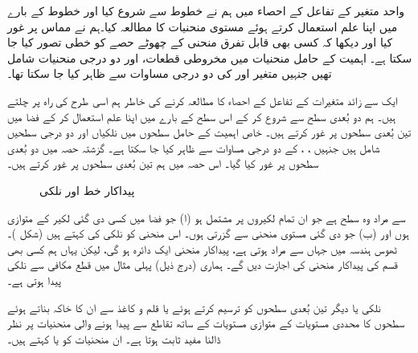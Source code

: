 واحد متغیر کے تفاعل کے احصاء میں  ہم  نے خطوط سے شروع کیا اور خطوط کے بارے میں اپنا علم  استعمال کرتے ہوئے مستوی منحنیات کا مطالعہ کیا۔ہم نے مماس پر غور کیا اور دیکھا کہ  کسی بھی قابل تفرق  منحنی    کے چھوٹے حصے  کو خطی تصور کیا جا سکتا ہے۔ اہمیت کے حامل منحنیات میں مخروطی قطعات، اور دو درجی منحنیات شامل تھیں جنہیں  متغیر  اور  کی دو درجی مساوات سے ظاہر کیا جا سکتا تھا۔

ایک سے زائد متغیرات   کے تفاعل کے احصاء  کا مطالعہ کرنے کی خاطر ہم اسی طرح کی راہ پر چلتے ہیں۔ ہم  دو بُعدی سطح سے شروع کر کے اس سطح کے بارے میں اپنا علم استعمال کر کے فضا میں تین بُعدی سطحوں پر غور کرتے ہیں۔ خاص اہمیت کے حامل سطحوں میں نلکیاں اور دو درجی سطحیں شامل ہیں جنہیں ، ،  کے دو درجی مساوات سے ظاہر کیا جا سکتا ہے۔ گزشتہ حصہ میں  دو بُعدی سطحوں پر غور کیا گیا۔ اس حصہ میں ہم تین بُعدی سطحوں پر غور کرتے ہیں۔
\begin{figure}
\centering
{}
\caption{پیداکار خط اور نلکی}
\label{شکل_سمتیہ_پیداکار_خط_اور_نلکی}
\end{figure}


 سے مراد وہ سطح ہے   جو  ان تمام لکیروں پر مشتمل ہو  (ا)  جو فضا میں کسی دی گئی  لکیر کے متوازی ہوں اور (ب)  جو دی گئی    مستوی منحنی سے گزرتی  ہوں۔  اس منحنی کو نلکی کی   کہتے ہیں (شکل )۔ ٹھوس ہندسہ میں   جہاں  سے مراد  ہوتی ہے، پیداکار منحنی ایک دائرہ ہو گی، لیکن یہاں ہم کسی بھی قسم کی پیداکار منحنی کی اجازت دیں گے۔ ہماری (درج ذیل) پہلی مثال میں  قطع مکافی  سے نلکی پیدا ہوتی ہے۔ 
 
نلکی یا دیگر تین بُعدی سطحوں کو ترسیم کرتے ہوئے یا قلم و کاغذ سے  ان کا خاکہ بناتے ہوئے    سطحوں کا محددی  مستویات کے متوازی مستویات کے ساتھ  تقاطع سے پیدا ہونے والی منحنیات  پر نظر ڈالنا مفید ثابت ہوتا ہے۔ ان  منحنیات کو   یا    کہتے ہیں۔

